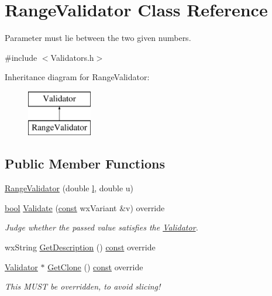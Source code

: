 \hypertarget{class_range_validator}{}\section{Range\+Validator Class Reference}
\label{class_range_validator}


Parameter must lie between the two given numbers.  




{\ttfamily \#include $<$Validators.\+h$>$}

Inheritance diagram for Range\+Validator\+:\begin{figure}[H]
\begin{center}
\leavevmode
\includegraphics[height=2.000000cm]{class_range_validator}
\end{center}
\end{figure}
\subsection*{Public Member Functions}
\begin{DoxyCompactItemize}
\item 
\hyperlink{class_range_validator_a2de191de11b86529e02e7c8e0181f17c}{Range\+Validator} (double \hyperlink{layer3_8c_a741dbb4d8e78c3cb69915db7282fcec0}{l}, double u)
\item 
\hyperlink{mac_2config_2i386_2lib-src_2libsoxr_2soxr-config_8h_abb452686968e48b67397da5f97445f5b}{bool} \hyperlink{class_range_validator_adb54290bf883cfa1e61cad708c79b5d4}{Validate} (\hyperlink{getopt1_8c_a2c212835823e3c54a8ab6d95c652660e}{const} wx\+Variant \&v) override
\begin{DoxyCompactList}\small\item\em Judge whether the passed value satisfies the \hyperlink{class_validator}{Validator}. \end{DoxyCompactList}\item 
wx\+String \hyperlink{class_range_validator_aba87c488633414997328ee6993767b5e}{Get\+Description} () \hyperlink{getopt1_8c_a2c212835823e3c54a8ab6d95c652660e}{const}  override
\item 
\hyperlink{class_validator}{Validator} $\ast$ \hyperlink{class_range_validator_af06c9f11349c2bef730bac9a68a41a95}{Get\+Clone} () \hyperlink{getopt1_8c_a2c212835823e3c54a8ab6d95c652660e}{const}  override
\begin{DoxyCompactList}\small\item\em This M\+U\+ST be overridden, to avoid slicing! \end{DoxyCompactList}\end{DoxyCompactItemize}


